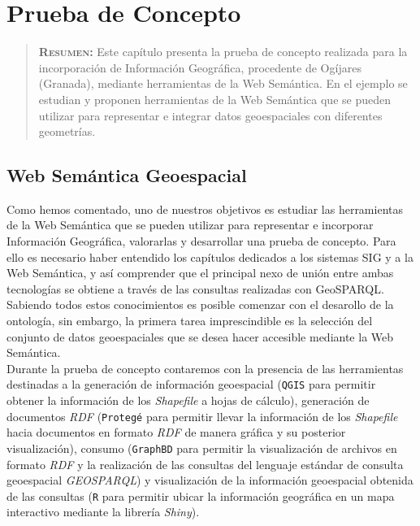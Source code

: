 \chapter{Prueba de Concepto}
\label{ch:aplicacion}

\begin{quote}
	{\bf\textsc{Resumen:}} Este capítulo presenta la prueba de concepto realizada para la incorporación de Información Geográfica, procedente de Ogíjares (Granada), mediante herramientas de la Web Semántica. En el ejemplo se estudian y proponen herramientas de la Web Semántica que se pueden utilizar para representar e integrar datos geoespaciales con diferentes geometrías.
\end{quote}



\section{Web Semántica Geoespacial}

Como hemos comentado, uno de nuestros objetivos es estudiar las herramientas de la Web Semántica que se pueden utilizar para representar e incorporar Información Geográfica, valorarlas y desarrollar una prueba de concepto. Para ello es necesario haber entendido los capítulos dedicados a los sistemas SIG y a la Web Semántica, y así comprender que el principal nexo de unión entre ambas tecnologías se obtiene a través de las consultas realizadas con GeoSPARQL. Sabiendo todos estos conocimientos es posible comenzar con el desarollo de la ontología, sin embargo, la primera tarea imprescindible es la selección del conjunto de datos geoespaciales que se desea hacer accesible mediante la Web Semántica. \\

Durante la prueba de concepto contaremos con la presencia de las herramientas destinadas a la generación de información geoespacial (\texttt{QGIS} para permitir obtener la información de los \textit{Shapefile} a hojas de cálculo), generación de documentos \textit{RDF}  (\texttt{Protegé} para permitir llevar la información de los \textit{Shapefile} hacia documentos en formato \textit{RDF} de manera gráfica y su posterior visualización), consumo (\texttt{GraphBD} para permitir la visualización de archivos en formato \textit{RDF} y la realización de las consultas del lenguaje estándar de consulta geoespacial \textit{GEOSPARQL}) y visualización de la información geoespacial obtenida de las consultas (\texttt{R} para permitir ubicar la información geográfica en un mapa interactivo mediante la librería \textit{Shiny}). 

